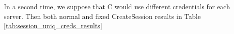 In a second time, we suppose that C would use different credentials for each server.
Then both normal and fixed CreateSession results in Table \ref{tab:session_uniq_creds_results}

\begin{table}[htb]
    \centering
    \label{tab:session_uniq_creds_results}
    \caption{Results for  sub-protocol with uniq credentials}
\end{table}
